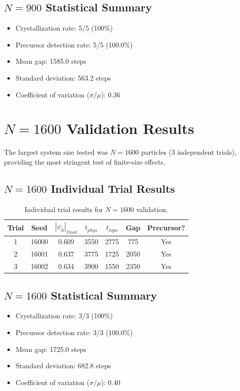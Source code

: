 \documentclass[11pt]{article}
\begin{document}
\subsection{$N=900$ Statistical Summary}

\begin{itemize}
    \item Crystallization rate: 5/5 (100\%)
    \item Precursor detection rate: 5/5 (100.0\%)
    \item Mean gap: 1585.0 steps
    \item Standard deviation: 563.2 steps
    \item Coefficient of variation ($\sigma/\mu$): 0.36
\end{itemize}

\section{$N=1600$ Validation Results}

The largest system size tested was $N=1600$ particles (3 independent trials), providing the most stringent test of finite-size effects.

\subsection{$N=1600$ Individual Trial Results}

\begin{table}[h]
\centering
\caption{Individual trial results for $N=1600$ validation.}
\label{tab:n1600trials}
\begin{tabular}{ccccccc}
\toprule
\textbf{Trial} & \textbf{Seed} & \textbf{$|\psi_6|_{final}$} & \textbf{$t_{phys}$} & \textbf{$t_{topo}$} & \textbf{Gap} & \textbf{Precursor?} \\
\midrule
1 & 16000 & 0.609 & 3550 & 2775 & 775 & Yes \\
2 & 16001 & 0.637 & 3775 & 1725 & 2050 & Yes \\
3 & 16002 & 0.634 & 3900 & 1550 & 2350 & Yes \\
\bottomrule
\end{tabular}
\end{table}

\subsection{$N=1600$ Statistical Summary}

\begin{itemize}
    \item Crystallization rate: 3/3 (100\%)
    \item Precursor detection rate: 3/3 (100.0\%)
    \item Mean gap: 1725.0 steps
    \item Standard deviation: 682.8 steps
    \item Coefficient of variation ($\sigma/\mu$): 0.40
\end{itemize}
\end{document}
